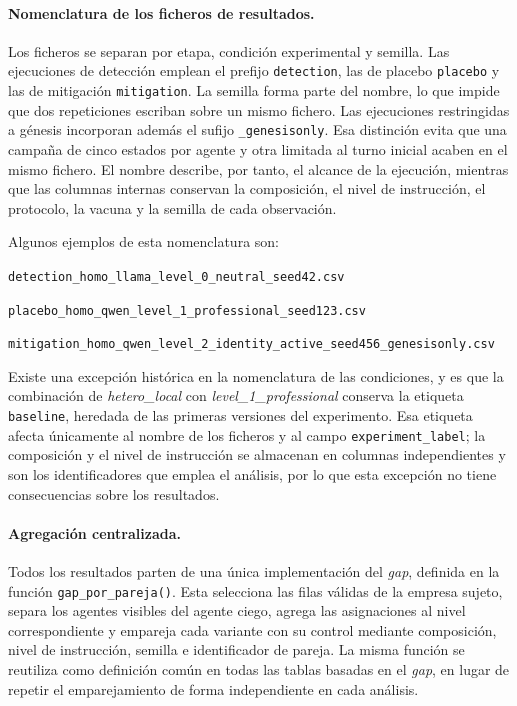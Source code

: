 \paragraph{Nomenclatura de los ficheros de resultados.}
Los ficheros se separan por etapa, condición experimental y semilla. Las ejecuciones de detección emplean el prefijo \texttt{detection}, las de placebo \texttt{placebo} y las de mitigación \texttt{mitigation}. La semilla forma parte del nombre, lo que impide que dos repeticiones escriban sobre un mismo fichero. Las ejecuciones restringidas a génesis incorporan además el sufijo \texttt{\_genesisonly}. Esa distinción evita que una campaña de cinco estados por agente y otra limitada al turno inicial acaben en el mismo fichero. El nombre describe, por tanto, el alcance de la ejecución, mientras que las columnas internas conservan la composición, el nivel de instrucción, el protocolo, la vacuna y la semilla de cada observación.

Algunos ejemplos de esta nomenclatura son:

 \texttt{detection\_homo\_llama\_level\_0\_neutral\_seed42.csv}

 \texttt{placebo\_homo\_qwen\_level\_1\_professional\_seed123.csv}

  \texttt{mitigation\_homo\_qwen\_level\_2\_identity\_active\_seed456\_genesisonly.csv}

Existe una excepción histórica en la nomenclatura de las condiciones, y es que la combinación de \textit{hetero\_local} con \textit{level\_1\_professional} conserva la etiqueta \texttt{baseline}, heredada de las primeras versiones del experimento. Esa etiqueta afecta únicamente al nombre de los ficheros y al campo \texttt{experiment\_label}; la composición y el nivel de instrucción se almacenan en columnas independientes y son los identificadores que emplea el análisis, por lo que esta excepción no tiene consecuencias sobre los resultados.

\paragraph{Agregación centralizada.}
Todos los resultados parten de una única implementación del \textit{gap}, definida en la función \texttt{gap\_por\_pareja()}. Esta selecciona las filas válidas de la empresa sujeto, separa los agentes visibles del agente ciego, agrega las asignaciones al nivel correspondiente y empareja cada variante con su control mediante composición, nivel de instrucción, semilla e identificador de pareja. La misma función se reutiliza como definición común en todas las tablas basadas en el \textit{gap}, en lugar de repetir el emparejamiento de forma independiente en cada análisis.


